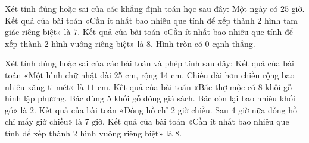 \begin{ex} %
Xét tính đúng hoặc sai của các khẳng định toán học sau đây:
\choiceTF
{Một ngày có $25$ giờ.}
{Kết quả của bài toán «Cần ít nhất bao nhiêu que tính để xếp thành 2 hình tam giác riêng biệt» là $7$.}
{\True Kết quả của bài toán «Cần ít nhất bao nhiêu que tính để xếp thành 2 hình vuông riêng biệt» là $8$.}
{\True Hình tròn có $0$ cạnh thẳng.}
\end{ex}

\begin{ex} %
Xét tính đúng hoặc sai của các bài toán và phép tính sau đây:
\choiceTF
{\True Kết quả của bài toán «Một hình chữ nhật dài 25 cm, rộng 14 cm. Chiều dài hơn chiều rộng bao nhiêu xăng-ti-mét» là $11\text{ cm}$.}
{Kết quả của bài toán «Bác thợ mộc có 8 khối gỗ hình lập phương. Bác dùng 5 khối gỗ đóng giá sách. Bác còn lại bao nhiêu khối gỗ» là $2$.}
{Kết quả của bài toán «Đồng hồ chỉ 2 giờ chiều. Sau 4 giờ nữa đồng hồ chỉ mấy giờ chiều» là $7\text{ giờ}$.}
{\True Kết quả của bài toán «Cần ít nhất bao nhiêu que tính để xếp thành 2 hình vuông riêng biệt» là $8$.}
\end{ex}


